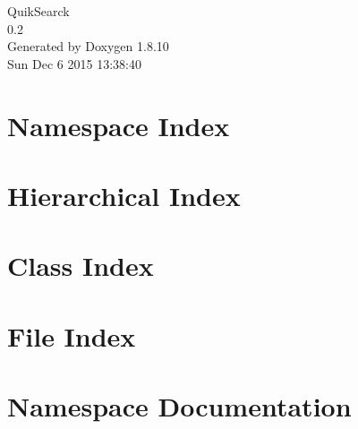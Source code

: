 \documentclass[twoside]{book}
\newcommand{\+}{\discretionary{\mbox{\scriptsize$\hookleftarrow$}}{}{}}
\newcommand{\clearemptydoublepage}{%
  \newpage{\pagestyle{empty}\cleardoublepage}%
}
\begin{document}
\hypersetup{pageanchor=false,
             bookmarks=true,
             bookmarksnumbered=true,
             pdfencoding=unicode
            }
\begin{titlepage}
\vspace*{7cm}
\begin{center}%
{\Large Quik\+Searck \\[1ex]\large 0.\+2 }\\
\vspace*{1cm}
{\large Generated by Doxygen 1.8.10}\\
\vspace*{0.5cm}
{\small Sun Dec 6 2015 13:38:40}\\
\end{center}
\end{titlepage}
\clearemptydoublepage
\tableofcontents
\clearemptydoublepage
{}
\hypersetup{pageanchor=true}

\chapter{Namespace Index}

\chapter{Hierarchical Index}

\chapter{Class Index}

\chapter{File Index}

\chapter{Namespace Documentation}



\end{document}
